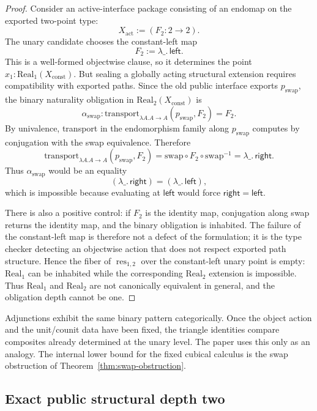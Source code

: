 \documentclass{lmcs}
\newcommand{\Real}{\mathrm{Real}}
\newcommand{\res}{\operatorname{res}}
\begin{document}
\begin{proof}
Consider an active-interface package consisting of an endomap on the exported two-point
type:
\[
  X_{\mathrm{act}} := (F_2 : 2\to 2).
\]
The unary candidate chooses the constant-left map
\[
  F_2 := \lambda\_.\,\mathsf{left}.
\]
This is a well-formed objectwise clause, so it determines the point
\(x_1:\Real_1(X_{\mathrm{const}})\).  But sealing a globally acting structural extension
requires compatibility with exported paths.  Since the old public interface exports
\(p_{\mathrm{swap}}\), the binary naturality obligation in \(\Real_2(X_{\mathrm{const}})\) is
\[
  \alpha_{\mathrm{swap}}:
  \mathrm{transport}_{\lambda A. A\to A}(p_{\mathrm{swap}},F_2)=F_2.
\]
By univalence, transport in the endomorphism family along \(p_{\mathrm{swap}}\) computes by
conjugation with the swap equivalence.  Therefore
\[
  \mathrm{transport}_{\lambda A. A\to A}(p_{\mathrm{swap}},F_2)
  =
  \mathrm{swap}\circ F_2\circ \mathrm{swap}^{-1}
  =
  \lambda\_.\,\mathsf{right}.
\]
Thus \(\alpha_{\mathrm{swap}}\) would be an equality
\[
  (\lambda\_.\,\mathsf{right})=(\lambda\_.\,\mathsf{left}),
\]
which is impossible because evaluating at \(\mathsf{left}\) would force
\(\mathsf{right}=\mathsf{left}\).

There is also a positive control: if \(F_2\) is the identity map, conjugation along swap
returns the identity map, and the binary obligation is inhabited.  The failure of the
constant-left map is therefore not a defect of the formulation; it is the type checker
detecting an objectwise action that does not respect exported path structure.  Hence the
fiber of \(\res_{1,2}\) over the constant-left unary point is empty: \(\Real_1\) can be
inhabited while the corresponding \(\Real_2\) extension is impossible.  Thus
\(\Real_1\) and \(\Real_2\) are not canonically equivalent in general, and the obligation
depth cannot be one.
\end{proof}

\begin{rem}
Adjunctions exhibit the same binary pattern categorically.  Once the object action and the
unit/counit data have been fixed, the triangle identities compare composites already
determined at the unary level.  The paper uses this only as an analogy.  The internal lower
bound for the fixed cubical calculus is the swap obstruction of
Theorem~\ref{thm:swap-obstruction}.
\end{rem}

\subsection{Exact public structural depth two}
\label{subsec:exact-depth-two-conclusion}
\end{document}
